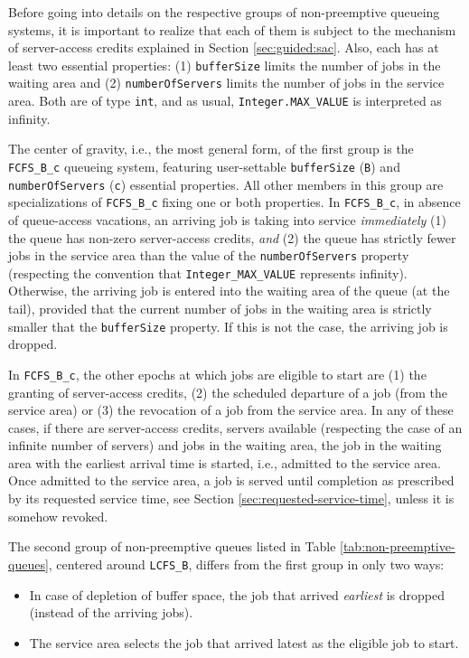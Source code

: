 Before going into details on the respective groups
  of non-preemptive queueing systems,
  it is important to realize that each of them
  is subject to the mechanism
  of server-access credits explained in
  Section \ref{sec:guided:sac}.
Also, each has at least two essential properties:
  (1) \lstinline|bufferSize|
  limits the number of jobs in the waiting area
  and
  (2)
  \lstinline|numberOfServers| limits the number
  of jobs in the service area.
Both are of type \lstinline|int|,
  and as usual,
  \lstinline|Integer.MAX_VALUE|
  is interpreted as infinity.

The center of gravity,
  i.e.,
  the most general form,
  of the first group is
  the \lstinline|FCFS_B_c|
  queueing system,
  featuring user-settable
  \lstinline|bufferSize|
  (\lstinline|B|)
  and
  \lstinline|numberOfServers|
  (\lstinline|c|)
  essential properties.
All other members in this group
  are specializations of \lstinline|FCFS_B_c|
  fixing one or both properties.
In \lstinline|FCFS_B_c|,
  in absence of queue-access vacations,
  an arriving job is taking into service
  {\em immediately}
  (1) the queue has non-zero server-access credits, {\em and\/}
  (2) the queue has strictly fewer jobs in the service area
      than the value of the \lstinline|numberOfServers|
      property (respecting the convention that
      \lstinline|Integer_MAX_VALUE| represents infinity).
Otherwise,
  the arriving job is entered into
  the waiting area of the queue (at the tail),
  provided that
  the current number of jobs in the waiting area
  is strictly smaller that the \lstinline|bufferSize|
  property.
If this is not the case,
  the arriving job is dropped.
  
In \lstinline|FCFS_B_c|,
  the other epochs at which jobs are eligible to start
  are (1) the granting of server-access credits,
  (2) the scheduled departure of a job (from the service area)
  or (3) the revocation of a job from the service area.
In any of these cases,
  if there are server-access credits,
  servers available
  (respecting the case of an infinite number of servers)
  and jobs in the waiting area,
  the job in the waiting area with the earliest
  arrival time is started,
  i.e.,
  admitted to the service area.
Once admitted to the service area,
  a job is served until completion as prescribed by
  its requested service time,
  see Section \ref{sec:requested-service-time},
  unless it is somehow revoked.
  
The second group of non-preemptive queues
  listed in Table \ref{tab:non-preemptive-queues},
  centered around \lstinline|LCFS_B|,
  differs from the first group in only two ways:
\begin{itemize}
  \item In case of depletion of buffer space,
          the job that arrived {\em earliest\/}
          is dropped (instead of the arriving jobs).
  \item The service area selects the job
          that arrived latest as the eligible job to
          start.
\end{itemize}

